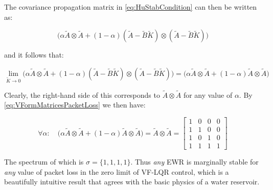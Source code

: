 The covariance propagation matrix in \cref{eq:HuStabCondition} can then be written as:

\begin{equation}
		\Big(\alpha \tilde{A} \otimes \tilde{A} + (1-\alpha)(\tilde{A}-\tilde{B}\tilde{K}) \otimes (\tilde{A}-\tilde{B}\tilde{K}) \Big)
\end{equation}

and it follows that:

\begin{equation}
	\lim_{\tilde{K}\rightarrow 0} \Big(\alpha \tilde{A} \otimes \tilde{A} + (1-\alpha)(\tilde{A}-\tilde{B}\tilde{K}) \otimes (\tilde{A}-\tilde{B}\tilde{K}) \Big) = \Big(\alpha \tilde{A} \otimes \tilde{A} + (1-\alpha)\tilde{A} \otimes \tilde{A}\Big)
\end{equation}

Clearly, the right-hand side of this corresponds to $\tilde{A}\otimes\tilde{A}$ for any value of $\alpha$. By \cref{eq:VFormMatricesPacketLoss} we then have:

\begin{equation}
	\forall \alpha: \quad \Big(\alpha \tilde{A} \otimes \tilde{A} + (1-\alpha)\tilde{A} \otimes \tilde{A}\Big) = \tilde{A}\otimes\tilde{A} 
	= \begin{bmatrix}  
		1 & 0 & 0 & 0 \\
		1 & 1 & 0 & 0 \\
		1 & 0 & 1 & 0 \\
		1 & 1 & 1 & 1	
	\end{bmatrix}
\end{equation}

The spectrum of which is $\sigma = \{1,1,1,1\}$. Thus \textit{any} EWR is marginally stable for \textit{any} value of packet loss in the zero limit of VF-LQR control, which is a beautifully intuitive result that agrees with the basic physics of a water reservoir.



